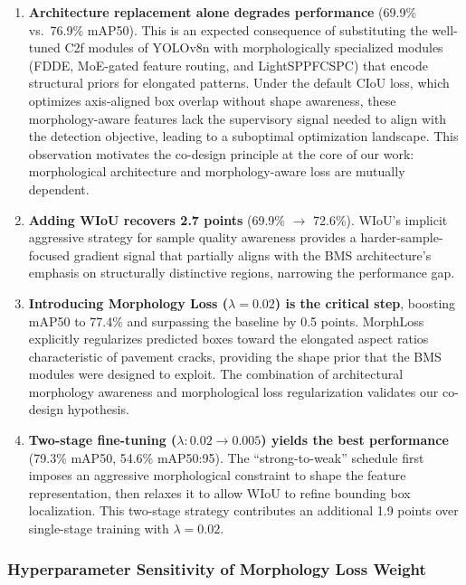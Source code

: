 \begin{enumerate}
\item \textbf{Architecture replacement alone degrades performance} (69.9\% vs.\ 76.9\% mAP50). This is an expected consequence of substituting the well-tuned C2f modules of YOLOv8n with morphologically specialized modules (FDDE, MoE-gated feature routing, and LightSPPFCSPC) that encode structural priors for elongated patterns. Under the default CIoU loss, which optimizes axis-aligned box overlap without shape awareness, these morphology-aware features lack the supervisory signal needed to align with the detection objective, leading to a suboptimal optimization landscape. This observation motivates the co-design principle at the core of our work: morphological architecture and morphology-aware loss are mutually dependent.

\item \textbf{Adding WIoU recovers 2.7 points} (69.9\% $\rightarrow$ 72.6\%). WIoU's implicit aggressive strategy for sample quality awareness provides a harder-sample-focused gradient signal that partially aligns with the BMS architecture's emphasis on structurally distinctive regions, narrowing the performance gap.

\item \textbf{Introducing Morphology Loss ($\lambda = 0.02$) is the critical step}, boosting mAP50 to 77.4\% and surpassing the baseline by 0.5 points. MorphLoss explicitly regularizes predicted boxes toward the elongated aspect ratios characteristic of pavement cracks, providing the shape prior that the BMS modules were designed to exploit. The combination of architectural morphology awareness and morphological loss regularization validates our co-design hypothesis.

\item \textbf{Two-stage fine-tuning ($\lambda: 0.02 \rightarrow 0.005$) yields the best performance} (79.3\% mAP50, 54.6\% mAP50:95). The ``strong-to-weak'' schedule first imposes an aggressive morphological constraint to shape the feature representation, then relaxes it to allow WIoU to refine bounding box localization. This two-stage strategy contributes an additional 1.9 points over single-stage training with $\lambda = 0.02$.
\end{enumerate}

\subsubsection{Hyperparameter Sensitivity of Morphology Loss Weight}

